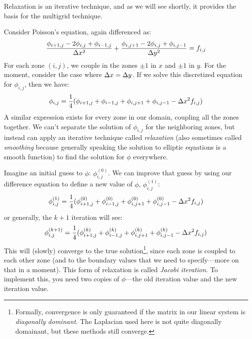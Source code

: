 Relaxation is an iterative technique, and as we will see shortly, it
provides the basis for the multigrid technique.  

Consider Poisson's equation, again differenced as:
\begin{equation}
\frac{\phi_{i+1,j} - 2 \phi_{i,j} + \phi_{i-1,j}}{\Delta x^2} +
\frac{\phi_{i,j+1} - 2 \phi_{i,j} + \phi_{i,j-1}}{\Delta y^2} = f_{i,j}
\end{equation}
For each zone $(i,j)$, we couple in the zones $\pm 1$ in $x$ and $\pm
1$ in $y$.  For the moment, consider the case where $\Delta x = \Delta y$.  If
we solve this discretized equation for $\phi_{i,j}$, then we have:
\begin{equation}
\phi_{i,j} = \frac{1}{4} (\phi_{i+1,j} + \phi_{i-1,j} + 
                          \phi_{i,j+1} + \phi_{i,j-1} - \Delta x^2 f_{i,j} )
\end{equation}
A similar expression exists for every zone in our domain, coupling all
the zones together.  We can't separate the solution of $\phi_{i,j}$
for the neighboring zones, but instead can apply an iterative
technique called {\em relaxation} (also sometimes called {\em
  smoothing} because generally speaking the solution to elliptic
equations is a smooth function) to find the solution for $\phi$
everywhere.  

Imagine an initial guess to $\phi$: $\phi_{i,j}^{(0)}$.
We can improve that guess by using our difference equation to define a
new value of $\phi$, $\phi_{i,j}^{(1)}$:
\begin{equation}
\phi_{i,j}^{(1)} = \frac{1}{4} (\phi_{i+1,j}^{(0)} + \phi_{i-1,j}^{(0)} + 
                                \phi_{i,j+1}^{(0)} + \phi_{i,j-1}^{(0)} - 
                                 \Delta x^2 f_{i,j} )
\end{equation}
or generally, the $k+1$ iteration will see:
\begin{equation}
\phi_{i,j}^{(k+1)} = \frac{1}{4} (\phi_{i+1,j}^{(k)} + \phi_{i-1,j}^{(k)} + 
                                  \phi_{i,j+1}^{(k)} + \phi_{i,j-1}^{(k)} - 
                                   \Delta x^2 f_{i,j} )
\end{equation}
This will (slowly) converge to the true solution\footnote{Formally,
  convergence is only guaranteed if the matrix in our linear system is
  {\em diagonally dominant}.  The Laplacian used here is not quite
  diagonally domainant, but these methods still converge.}, since each
zone is coupled to each other zone (and to the boundary values that we
need to specify---more on that in a moment).  This form of relaxation
is called {\em Jacobi iteration}.  To implement this, you need two
copies of $\phi$---the old iteration value and the new iteration
value.

